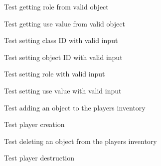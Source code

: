 \begin{DoxyRefList}
%
Test getting role from valid object  
\item[Global \doxylink{object__test_8c_a8f1d049488cedbdea180c1ec8d9c0b5c}{test1\+\_\+object\+\_\+get\+\_\+use\+\_\+value} ()]\label{test__test000127}%
%
Test getting use value from valid object  
\item[Global \doxylink{object__test_8c_aa68544c5291d17ea25aae04f2751bcae}{test1\+\_\+object\+\_\+set\+\_\+class\+\_\+id} ()]\label{test__test000121}%
%
Test setting class ID with valid input  
\item[Global \doxylink{object__test_8c_a6f19ebf6034115c2cdcc3c7bfea25964}{test1\+\_\+object\+\_\+set\+\_\+id} ()]\label{test__test000117}%
%
Test setting object ID with valid input  
\item[Global \doxylink{object__test_8c_af4eeb56536e723e7fa5e83d3e30e491b}{test1\+\_\+object\+\_\+set\+\_\+role} ()]\label{test__test000125}%
%
Test setting role with valid input  
\item[Global \doxylink{object__test_8c_a699c0d2b25704877b892ed04c6696893}{test1\+\_\+object\+\_\+set\+\_\+use\+\_\+value} ()]\label{test__test000129}%
%
Test setting use value with valid input  
\item[Global \doxylink{player__test_8c_a14a3e4867e2ad3287c8efa99cd36904e}{test1\+\_\+player\+\_\+add\+\_\+object} ()]\label{test__test000143}%
%
Test adding an object to the player\textquotesingle{}s inventory  
\item[Global \doxylink{player__test_8c_ab29768452373e16bb6aaa1f7998f62fb}{test1\+\_\+player\+\_\+create} ()]\label{test__test000131}%
%
Test player creation  
\item[Global \doxylink{player__test_8c_aabc3452e06ab25fb08835566d403890f}{test1\+\_\+player\+\_\+delete\+\_\+object} ()]\label{test__test000145}%
%
Test deleting an object from the player\textquotesingle{}s inventory  
\item[Global \doxylink{player__test_8c_a14d75d99f9fce3bd703b0c242c8690f9}{test1\+\_\+player\+\_\+destroy} ()]\label{test__test000133}%
%
Test player destruction  
\item[Global \doxylink{player__test_8c_a496918ca995d418e8e2696717a9690f4}{test1\+\_\+player\+\_\+get\+\_\+gdesc} ()]\label{test__test000162}%
%

\end{DoxyRefList}
